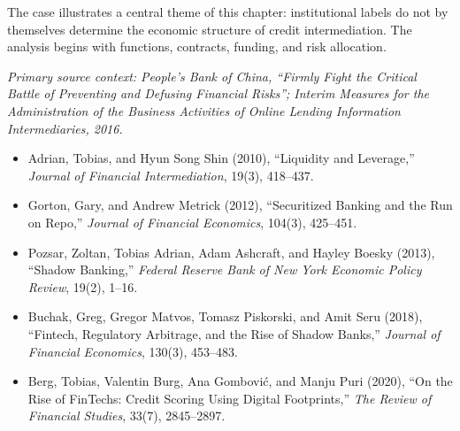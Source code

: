The case illustrates a central theme of this chapter: institutional labels do not by themselves determine the economic structure of credit intermediation. The analysis begins with functions, contracts, funding, and risk allocation.

\emph{Primary source context: People's Bank of China, ``Firmly Fight the Critical Battle of Preventing and Defusing Financial Risks''; \emph{Interim Measures for the Administration of the Business Activities of Online Lending Information Intermediaries}, 2016.}



\begin{itemize}

\item Adrian, Tobias, and Hyun Song Shin (2010),
``Liquidity and Leverage,''
\emph{Journal of Financial Intermediation}, 19(3), 418--437.

\item Gorton, Gary, and Andrew Metrick (2012),
``Securitized Banking and the Run on Repo,''
\emph{Journal of Financial Economics}, 104(3), 425--451.

\item Pozsar, Zoltan, Tobias Adrian, Adam Ashcraft, and Hayley Boesky (2013),
``Shadow Banking,''
\emph{Federal Reserve Bank of New York Economic Policy Review}, 19(2), 1--16.

\item Buchak, Greg, Gregor Matvos, Tomasz Piskorski, and Amit Seru (2018),
``Fintech, Regulatory Arbitrage, and the Rise of Shadow Banks,''
\emph{Journal of Financial Economics}, 130(3), 453--483.

\item Berg, Tobias, Valentin Burg, Ana Gombovi\'c, and Manju Puri (2020),
``On the Rise of FinTechs: Credit Scoring Using Digital Footprints,''
\emph{The Review of Financial Studies}, 33(7), 2845--2897.
\end{itemize}

